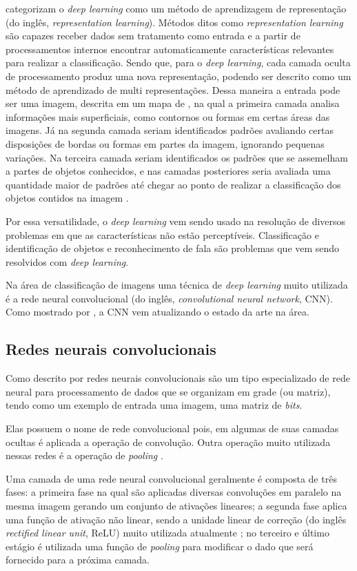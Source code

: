\par {} categorizam o \textit{deep learning} como um método de aprendizagem de representação (do inglês, \textit{representation learning}). Métodos ditos como \textit{representation learning} são capazes receber dados sem tratamento como entrada e a partir de processamentos internos encontrar automaticamente características relevantes para realizar a classificação. Sendo que, para o \textit{deep learning}, cada camada oculta de processamento produz uma nova representação, podendo ser descrito como um método de aprendizado de multi representações. Dessa maneira a entrada pode ser uma imagem, descrita em um mapa de , na qual a primeira camada analisa informações mais superficiais, como contornos ou formas em certas áreas das imagens. Já na segunda camada seriam identificados padrões avaliando certas disposições de bordas ou formas em partes da imagem, ignorando pequenas variações. Na terceira camada seriam identificados os padrões que se assemelham a partes de objetos conhecidos, e nas camadas posteriores seria avaliada uma quantidade maior de padrões até chegar ao ponto de realizar a classificação dos objetos contidos na imagem \cite{lecun2015deep}.

\par Por essa versatilidade, o \textit{deep learning} vem sendo usado na resolução de diversos problemas em que as características não estão perceptíveis. Classificação e identificação de objetos \cite{farabet2013learning} e reconhecimento de fala \cite{hinton2012deep} são problemas que vem sendo resolvidos com \textit{deep learning}.
\par Na área de classificação de imagens uma técnica de \textit{deep learning} muito utilizada é a rede neural convolucional (do inglês, \textit{convolutional neural network}, CNN). Como mostrado por , a CNN vem atualizando o estado da arte na área.

\subsection{Redes neurais convolucionais}
Como descrito por  redes neurais convolucionais são um tipo especializado de rede neural para processamento de dados que se organizam em grade (ou matriz), tendo como um exemplo de entrada uma imagem, uma matriz de \textit{bits}.
\par Elas possuem o nome de rede convolucional pois, em algumas de suas camadas ocultas é aplicada a operação de convolução. Outra operação muito utilizada nessas redes é a operação de \textit{pooling} \cite{Goodfellow-et-al-2016}.
\par Uma camada de uma rede neural convolucional geralmente é composta de três fases: a primeira fase na qual são aplicadas diversas convoluções em paralelo na mesma imagem gerando um conjunto de ativações lineares; a segunda fase aplica uma função de ativação não linear, sendo a unidade linear de correção (do inglês \textit{rectified linear unit}, ReLU) muito utilizada atualmente \cite{lecun2015deep}; no terceiro e último estágio é utilizada uma função de \textit{pooling} para modificar o dado que será fornecido para a próxima camada.    


